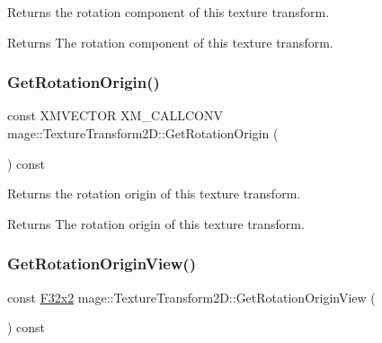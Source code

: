 Returns the rotation component of this texture transform.

\begin{DoxyReturn}{Returns}
The rotation component of this texture transform. 
\end{DoxyReturn}
\mbox{\label{classmage_1_1_texture_transform2_d_ab8724aa62179a1a4627d0ff0f9079be2}} 
\subsubsection{\texorpdfstring{Get\+Rotation\+Origin()}{GetRotationOrigin()}}
{\footnotesize\ttfamily const X\+M\+V\+E\+C\+T\+OR X\+M\+\_\+\+C\+A\+L\+L\+C\+O\+NV mage\+::\+Texture\+Transform2\+D\+::\+Get\+Rotation\+Origin (\begin{DoxyParamCaption}{ }\end{DoxyParamCaption}) const\hspace{0.3cm}{\ttfamily [noexcept]}}

Returns the rotation origin of this texture transform.

\begin{DoxyReturn}{Returns}
The rotation origin of this texture transform. 
\end{DoxyReturn}
\mbox{\label{classmage_1_1_texture_transform2_d_a87d872e53687f91c9d281944799b5fc4}} 
\subsubsection{\texorpdfstring{Get\+Rotation\+Origin\+View()}{GetRotationOriginView()}}
{\footnotesize\ttfamily const \mbox{\hyperlink{namespacemage_aee4759dedc8def6c6dec26b5c7eddf29}{F32x2}} mage\+::\+Texture\+Transform2\+D\+::\+Get\+Rotation\+Origin\+View (\begin{DoxyParamCaption}{ }\end{DoxyParamCaption}) const\hspace{0.3cm}{\ttfamily [noexcept]}}

